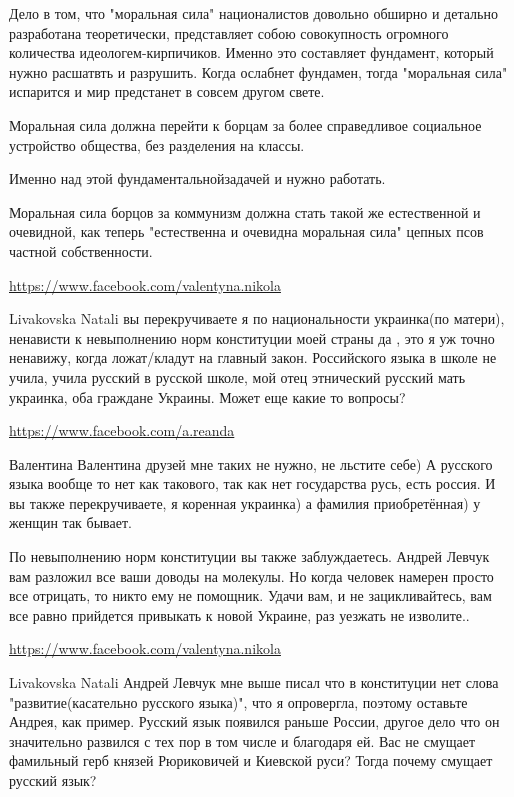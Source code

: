 \documentclass[a4paper,11pt]{extreport}
\begin{document}
\begin{itemize}
Дело в том, что "моральная сила" националистов довольно обширно и детально разработана теоретически, представляет собою совокупность огромного количества идеологем-кирпичиков.
Именно это составляет фундамент, который нужно расшатвть и разрушить. Когда ослабнет фундамен, тогда "моральная сила" испарится и мир предстанет в совсем другом свете.

Моральная сила должна перейти к борцам за более справедливое социальное устройство общества, без разделения на классы.

Именно над этой фундаментальнойзадачей и нужно работать.

Моральная сила борцов за коммунизм должна стать такой же естественной и очевидной, как теперь "естественна и очевидна моральная сила" цепных псов частной собственности.

\begin{itemize}
\url{https://www.facebook.com/valentyna.nikola}

Livakovska Natali вы перекручиваете я по национальности украинка(по матери), ненависти к невыполнению норм конституции моей страны да , это я уж точно ненавижу, когда ложат/кладут на главный закон.
Российского языка в школе не учила, учила русский в русской школе, мой отец этнический русский мать украинка, оба граждане Украины.
Может еще какие то вопросы?

\url{https://www.facebook.com/a.reanda}

Валентина Валентина друзей мне таких не нужно, не льстите себе)
А русского языка вообще то нет как такового, так как нет государства русь, есть россия.
И вы также перекручиваете, я коренная украинка) а фамилия приобретённая) у женщин так бывает.

По невыполнению норм конституции вы также заблуждаетесь. Андрей Левчук вам разложил все ваши доводы на молекулы. Но когда человек намерен просто все отрицать, то никто ему не помощник. Удачи вам, и не зацикливайтесь, вам все равно прийдется привыкать к новой Украине, раз уезжать не изволите..

\url{https://www.facebook.com/valentyna.nikola}

Livakovska Natali Андрей Левчук мне выше писал что в конституции нет слова "развитие(касательно русского языка)", что я опровергла, поэтому оставьте Андрея, как пример. Русский язык появился раньше России, другое дело что он значительно развился с тех пор в том числе и благодаря ей.
Вас не смущает фамильный герб князей Рюриковичей и Киевской руси? Тогда почему смущает русский язык?


\end{itemize}
\end{itemize}
\end{document}

